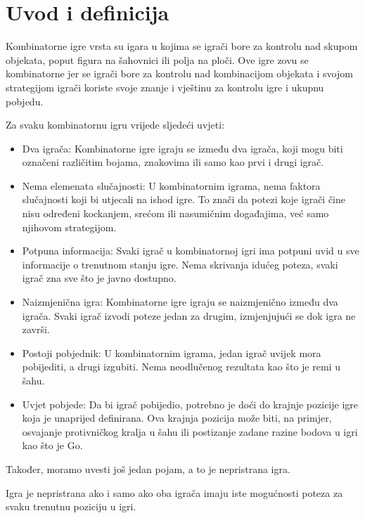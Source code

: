  \section{Uvod i definicija}

Kombinatorne igre vrsta su igara u kojima se igrači bore za kontrolu nad skupom objekata, poput figura na šahovnici ili polja na ploči. Ove igre zovu se kombinatorne jer se igrači bore za kontrolu nad kombinacijom objekata i svojom strategijom igrači koriste svoje znanje i vještinu za kontrolu igre i ukupnu pobjedu.\newline

Za svaku kombinatornu igru vrijede sljedeći uvjeti\cite{garner2007combinatorialgametheory}:

\begin{itemize}
    \item Dva igrača: Kombinatorne igre igraju se između dva igrača, koji mogu biti označeni različitim bojama, znakovima ili samo kao prvi i drugi igrač. 
    \item Nema elemenata slučajnosti: U kombinatornim igrama, nema faktora slučajnosti koji bi utjecali na ishod igre. To znači da potezi koje igrači čine nisu određeni kockanjem, srećom ili nasumičnim događajima, već samo njihovom strategijom.
    \item Potpuna informacija: Svaki igrač u kombinatornoj igri ima potpuni uvid u sve informacije o trenutnom stanju igre. Nema skrivanja idućeg poteza, svaki igrač zna sve što je javno dostupno.
    \item Naizmjenična igra: Kombinatorne igre igraju se naizmjenično između dva igrača. Svaki igrač izvodi poteze jedan za drugim, izmjenjujući se dok igra ne završi.
    \item Postoji pobjednik: U kombinatornim igrama, jedan igrač uvijek mora pobijediti, a drugi izgubiti. Nema neodlučenog rezultata kao što je remi u šahu.
    \item Uvjet pobjede: Da bi igrač pobijedio, potrebno je doći do krajnje pozicije igre koja je unaprijed definirana. Ova krajnja pozicija može biti, na primjer, osvajanje protivničkog kralja u šahu ili postizanje zadane razine bodova u igri kao što je Go. 
\end{itemize}


Također, moramo uvesti još jedan pojam, a to je nepristrana igra\cite{2001winningwaysforyourmathematicalplays}.

\begin{definition}
Igra je nepristrana ako i samo ako oba igrača imaju iste mogućnosti poteza za svaku trenutnu poziciju u igri.
\end{definition}
 


